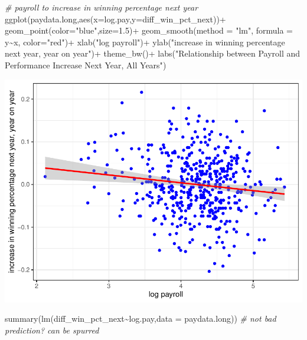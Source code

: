 \documentclass[
  12pt,
]{article}
\newenvironment{Shaded}{\begin{snugshade}}{\end{snugshade}}
\newcommand{\AttributeTok}[1]{\textcolor[rgb]{0.77,0.63,0.00}{#1}}
\newcommand{\CommentTok}[1]{\textcolor[rgb]{0.56,0.35,0.01}{\textit{#1}}}
\newcommand{\FloatTok}[1]{\textcolor[rgb]{0.00,0.00,0.81}{#1}}
\newcommand{\FunctionTok}[1]{\textcolor[rgb]{0.00,0.00,0.00}{#1}}
\newcommand{\NormalTok}[1]{#1}
\newcommand{\SpecialCharTok}[1]{\textcolor[rgb]{0.00,0.00,0.00}{#1}}
\newcommand{\StringTok}[1]{\textcolor[rgb]{0.31,0.60,0.02}{#1}}
\begin{document}
\begin{Shaded}
\begin{Highlighting}[]
\CommentTok{\# payroll to increase in winning percentage next year}
\FunctionTok{ggplot}\NormalTok{(paydata.long,}\FunctionTok{aes}\NormalTok{(}\AttributeTok{x=}\NormalTok{log.pay,}\AttributeTok{y=}\NormalTok{diff\_win\_pct\_next))}\SpecialCharTok{+}
  \FunctionTok{geom\_point}\NormalTok{(}\AttributeTok{color=}\StringTok{"blue"}\NormalTok{,}\AttributeTok{size=}\FloatTok{1.5}\NormalTok{)}\SpecialCharTok{+}
  \FunctionTok{geom\_smooth}\NormalTok{(}\AttributeTok{method =} \StringTok{"lm"}\NormalTok{, }\AttributeTok{formula =}\NormalTok{ y}\SpecialCharTok{\textasciitilde{}}\NormalTok{x, }\AttributeTok{color=}\StringTok{"red"}\NormalTok{)}\SpecialCharTok{+}
  \FunctionTok{xlab}\NormalTok{(}\StringTok{"log payroll"}\NormalTok{)}\SpecialCharTok{+}
  \FunctionTok{ylab}\NormalTok{(}\StringTok{"increase in winning percentage next year, year on year"}\NormalTok{)}\SpecialCharTok{+}
  \FunctionTok{theme\_bw}\NormalTok{()}\SpecialCharTok{+}
  \FunctionTok{labs}\NormalTok{(}\StringTok{"Relationship between Payroll and Performance Increase Next Year, All Years"}\NormalTok{)}
\end{Highlighting}
\end{Shaded}

\includegraphics{hw1_sol_files/figure-latex/unnamed-chunk-17-2.pdf}

\begin{Shaded}
\begin{Highlighting}[]
\FunctionTok{summary}\NormalTok{(}\FunctionTok{lm}\NormalTok{(diff\_win\_pct\_next}\SpecialCharTok{\textasciitilde{}}\NormalTok{log.pay,}\AttributeTok{data =}\NormalTok{ paydata.long)) }\CommentTok{\# not bad prediction? can be spurred}
\end{Highlighting}
\end{Shaded}
\end{document}
